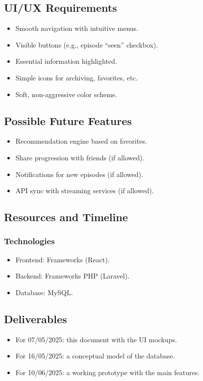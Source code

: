 \subsection{UI/UX Requirements}
\begin{itemize}
    \item Smooth navigation with intuitive menus.
    \item Visible buttons (e.g., episode “seen” checkbox).
    \item Essential information highlighted.
    \item Simple icons for archiving, favorites, etc.
    \item Soft, non-aggressive color scheme.
\end{itemize}

\subsection{Possible Future Features}
\begin{itemize}
    \item Recommendation engine based on favorites.
    \item Share progression with friends (if allowed).
    \item Notifications for new episodes (if allowed).
    \item API sync with streaming services (if allowed).
\end{itemize}

\subsection{Resources and Timeline}

\subsubsection{Technologies}
\begin{itemize}
    \item Frontend: Frameworks (React).
    \item Backend: Frameworks PHP (Laravel).
    \item Database: MySQL.
\end{itemize}

\subsection{Deliverables}
\begin{itemize}
    \item For 07/05/2025: this document with the UI mockups.
    \item For 16/05/2025: a conceptual model of the database.
    \item For 10/06/2025: a working prototype with the main features.
\end{itemize}
